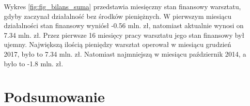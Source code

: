 \documentclass{article}\usepackage[]{graphicx}\usepackage[]{xcolor}
\begin{document}
Wykres \ref{fig:fig_bilans_suma} przedstawia miesięczny stan finansowy warsztatu, gdyby zaczynał działalność bez środków pieniężnych. W pierwszym miesiącu działalności stan finansowy wyniósł -0.56 mln. zł, natomiast aktualnie wynosi on 7.34 mln. zł. Przez pierwsze 16 miesięcy pracy warsztatu jego stan finansowy był ujemny.
Największą ilością pieniędzy warsztat operował w miesiącu grudzień 2017, było to 7.34 mln. zł.
Natomiast najmniejszą w miesiącu październik 2014, a było to -1.8 mln. zł.

\section{Podsumowanie}
\end{document}
